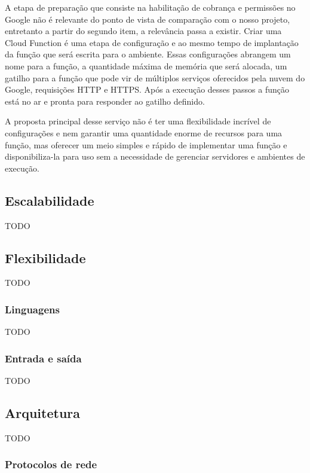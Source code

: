 A etapa de preparação que consiste na habilitação de cobrança e permissões no Google não é relevante do ponto de vista de comparação com o nosso projeto, entretanto a partir do segundo item, a relevância passa a existir.
Criar uma Cloud Function é uma etapa de configuração e ao mesmo tempo de implantação da função que será escrita para o ambiente. Essas configurações abrangem um nome para a função, a quantidade máxima de memória que será alocada, um gatilho para a função que pode vir de múltiplos serviços oferecidos pela nuvem do Google, requisições HTTP e HTTPS. Após a execução desses passos a função está no ar e pronta para responder ao gatilho definido.

\bigskip
A proposta principal desse serviço não é ter uma flexibilidade incrível de configurações e nem garantir uma quantidade enorme de recursos para uma função, mas oferecer um meio simples e rápido de implementar uma função e disponibiliza-la para uso sem a necessidade de gerenciar servidores e ambientes de execução.

\subsection{Escalabilidade}

TODO

\subsection{Flexibilidade}

TODO

\subsubsection{Linguagens}

TODO

\subsubsection{Entrada e saída}

TODO

\subsection{Arquitetura}

TODO

\subsubsection{Protocolos de rede}

